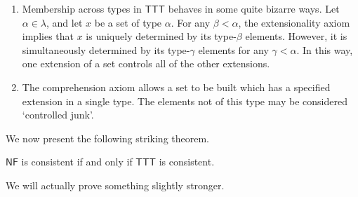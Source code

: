 \begin{remarks}\mbox{\negthinspace}
	\begin{enumerate}
		\item Membership across types in \( \mathsf{TTT} \) behaves in some quite bizarre ways.
		Let \( \alpha \in \lambda \), and let \( x \) be a set of type \( \alpha \).
		For any \( \beta < \alpha \), the extensionality axiom implies that \( x \) is uniquely determined by its type-\( \beta \) elements.
		However, it is simultaneously determined by its type-\( \gamma \) elements for any \( \gamma < \alpha \).
		In this way, one extension of a set controls all of the other extensions.
		\item The comprehension axiom allows a set to be built which has a specified extension in a single type.
		The elements not of this type may be considered `controlled junk'.
	\end{enumerate}
\end{remarks}

We now present the following striking theorem.

\begin{theorem}[Holmes]
	\( \mathsf{NF} \) is consistent if and only if \( \mathsf{TTT} \) is consistent. \cite{holmes-ttt}
\end{theorem}

We will actually prove something slightly stronger.

